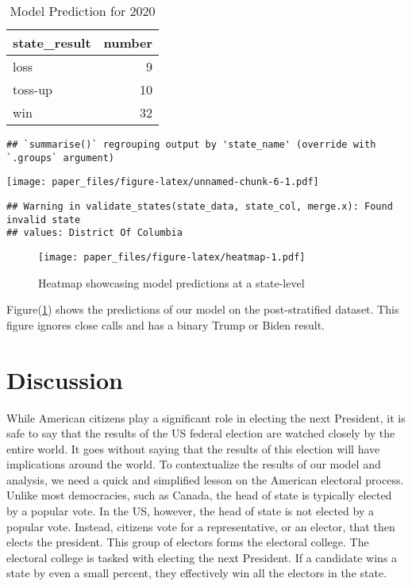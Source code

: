\documentclass[
]{article}
\begin{document}
\begin{table}

\caption{\label{tab:model2020prediction}Model Prediction for 2020}
\centering
\begin{tabular}[t]{l|r}
\hline
state\_result & number\\
\hline
loss & 9\\
\hline
toss-up & 10\\
\hline
win & 32\\
\hline
\end{tabular}
\end{table}

\begin{verbatim}
## `summarise()` regrouping output by 'state_name' (override with `.groups` argument)
\end{verbatim}

\texttt{[image: paper\_files/figure-latex/unnamed-chunk-6-1.pdf]}

\begin{verbatim}
## Warning in validate_states(state_data, state_col, merge.x): Found invalid state
## values: District Of Columbia
\end{verbatim}

\begin{figure}
\centering
\texttt{[image: paper\_files/figure-latex/heatmap-1.pdf]}
\caption{\label{fig:heatmap}Heatmap showcasing model predictions at a state-level}
\end{figure}

Figure(\ref{fig:heatmap}) shows the predictions of our model on the post-stratified dataset. This figure ignores close calls and has a binary Trump or Biden result.

\hypertarget{discussion}{%
\section{Discussion}\label{discussion}}

While American citizens play a significant role in electing the next President, it is safe to say that the results of the US federal election are watched closely by the entire world. It goes without saying that the results of this election will have implications around the world. To contextualize the results of our model and analysis, we need a quick and simplified lesson on the American electoral process. Unlike most democracies, such as Canada, the head of state is typically elected by a popular vote. In the US, however, the head of state is not elected by a popular vote. Instead, citizens vote for a representative, or an elector, that then elects the president. This group of electors forms the electoral college. The electoral college is tasked with electing the next President. If a candidate wins a state by even a small percent, they effectively win all the electors in the state.
\end{document}
